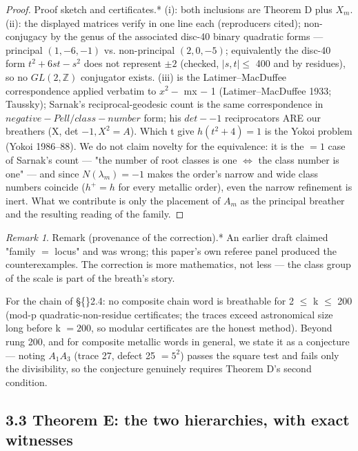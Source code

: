 \documentclass[11pt]{article}
\theoremstyle{plain}
\theoremstyle{definition}
\theoremstyle{remark}
\newtheorem*{remark}{Remark}
\begin{document}
\begin{proof}Proof sketch and certificates.* (i): both inclusions are Theorem D plus \(X_{m}\). (ii): the displayed matrices verify in one line each (reproducers cited); non-conjugacy by the genus of the associated disc-40 binary quadratic forms — principal \((1,-6,-1)\) vs. non-principal \((2,0,-5)\); equivalently the disc-40 form \(t^{2} + 6st - s^{2}\) does not represent \(\pm 2\) (checked, \(|s,t| \le \) 400 and by residues), so no \(GL(2,\mathbb{Z})\) conjugator exists. (iii) is the Latimer–MacDuffee correspondence applied verbatim to \(x^{2} -\) mx \(-\) 1 (Latimer–MacDuffee 1933; Taussky); Sarnak's reciprocal-geodesic count is the same correspondence in \(negative-Pell/class-number\) form; his \(det--1\) reciprocators ARE our breathers (X, det \(-1, X^{2} = A\)). Which t give \(h(t^{2}+4) = 1\) is the Yokoi problem (Yokoi 1986–88). We do not claim novelty for the equivalence: it is the \(=1\) case of Sarnak's count — "the number of root classes is one \(\Longleftrightarrow \) the class number is one" — and since \(N(\lambda _{m}) = -1\) makes the order's narrow and wide class numbers coincide (\(h^{+} = h\) for every metallic order), even the narrow refinement is inert. What we contribute is only the placement of \(A_{m}\) as the principal breather and the resulting reading of the family. \end{proof}

\begin{remark}Remark (provenance of the correction).* An earlier draft claimed "family \(=\) locus" and was wrong; this paper's own referee panel produced the counterexamples. The correction is more mathematics, not less — the class group of the scale is part of the breath's story.\end{remark}

For the chain of \S\{\}2.4: no composite chain word is breathable for 2 \(\le \) k \(\le \) 200 (mod-p quadratic-non-residue certificates; the traces exceed astronomical size long before k \(= 200\), so modular certificates are the honest method). Beyond rung 200, and for composite metallic words in general, we state it as a conjecture — noting \(A_{1}A_{3}\) (trace 27, defect 25 \(= 5^{2}\)) passes the square test and fails only the divisibility, so the conjecture genuinely requires Theorem D's second condition.

\subsection{3.3 Theorem E: the two hierarchies, with exact witnesses}
\end{document}
